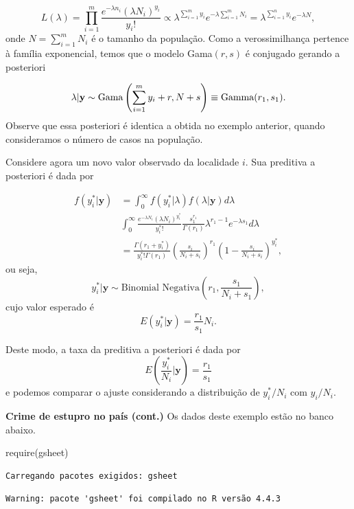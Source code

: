 \documentclass[
  letterpaper,
  DIV=11,
  numbers=noendperiod]{scrreprt}
\newenvironment{Shaded}{\begin{snugshade}}{\end{snugshade}}
\newcommand{\FunctionTok}[1]{\textcolor[rgb]{0.28,0.35,0.67}{#1}}
\newcommand{\NormalTok}[1]{\textcolor[rgb]{0.00,0.23,0.31}{#1}}
\theoremstyle{definition}
\theoremstyle{plain}
\theoremstyle{definition}
\theoremstyle{remark}
\begin{document}
\[L(\lambda)=\prod_{i=1}^m\frac{e^{-\lambda n_i}(\lambda N_i)^{y_i}}{y_i!}\varpropto \lambda^{\sum_{i=1}^m y_i}e^{-\lambda \sum_{i=1}^m N_i}=\lambda^{\sum_{i=1}^n y_i}e^{-\lambda N},\]
onde \(N=\sum_{i=1}^m N_i\) é o tamanho da população. Como a
verossimilhança pertence à família exponencial, temos que o modelo
Gama\((r,s)\) é conjugado gerando a posteriori

\[\lambda|\mathbf{y}\sim\hbox{Gama}\left(\sum_{i=1}^{m}y_i+r,N+s\right)\equiv \hbox{Gamma}(r_1,s_1).\]
Observe que essa posteriori é identica a obtida no exemplo anterior,
quando consideramos o número de casos na população.

Considere agora um novo valor observado da localidade \(i\). Sua
preditiva a posteriori é dada por

\[\begin{align}
f(y^*_i|\boldsymbol{y})&=\int_0^\infty f(y^*_i|\lambda)f(\lambda|\boldsymbol{y})d\lambda\\
&\int_0^\infty \frac{e^{-\lambda N_i}(\lambda N_i)^{y_i^*}}{y_i^*!}\frac{s_1^{r_1}}{\Gamma(r_1)}\lambda^{r_1-1}e^{-\lambda s_1}d\lambda\\
&=\frac{\Gamma(r_1+y_i^*)}{y_i^*!\Gamma(r_1)}\left(\frac{s_i}{N_i+s_i}\right)^{r_1}\left(1-\frac{s_i}{N_i+s_i}\right)^{y_i^*},
\end{align}\] ou seja,
\[y_i^*|\boldsymbol{y}\sim\text{Binomial Negativa}\left(r_1,\frac{s_1}{N_i+s_1}\right),\]
cujo valor esperado é \[E(y_i^*|\boldsymbol{y})=\frac{r_1}{s_1}N_i.\]

Deste modo, a taxa da preditiva a posteriori é dada por
\[E(\frac{y_i^*}{N_i}|\boldsymbol{y})=\frac{r_1}{s_1}\] e podemos
comparar o ajuste considerando a distribuição de \(y^*_i/N_i\) com
\(y_i/N_i\).

\label{exm}
\textbf{Crime de estupro no país (cont.)} Os dados deste exemplo estão
no banco abaixo.

\begin{Shaded}
\begin{Highlighting}[]
\FunctionTok{require}\NormalTok{(gsheet)}
\end{Highlighting}
\end{Shaded}

\begin{verbatim}
Carregando pacotes exigidos: gsheet
\end{verbatim}

\begin{verbatim}
Warning: pacote 'gsheet' foi compilado no R versão 4.4.3
\end{verbatim}
\end{document}
